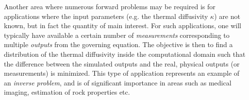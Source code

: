 Another area where numerous forward problems may be required is for applications
where the input parameters (e.g. the thermal diffusivity $\kappa$) are not
known, but in fact the quantity of main interest. For such applications, one
will typically have available a certain number of \emph{measurements}
corresponding to multiple \emph{outputs} from the governing equation. The
objective is then to find a distribution of the thermal diffusivity inside the
computational domain such that the difference between the simulated outputs and
the real, physical outputs (or measurements) is minimized. This type of
application represents an example of an \emph{inverse problem}, and is of
significant importance in areas such as medical imaging, estimation of rock
properties etc.
